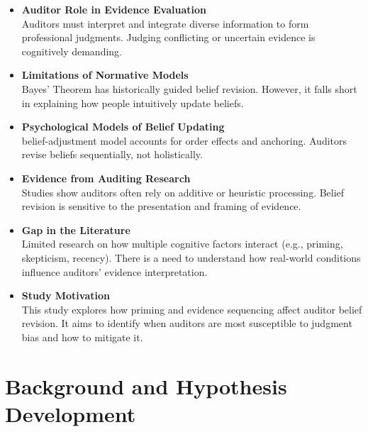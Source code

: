 \documentclass[12pt,english]{article}
\begin{document}
\begin{itemize}
    \item \textbf{Auditor Role in Evidence Evaluation} \\
    Auditors must interpret and integrate diverse information to form professional judgments. Judging conflicting or uncertain evidence is cognitively demanding.

    \item \textbf{Limitations of Normative Models} \\
    Bayes’ Theorem has historically guided belief revision. However, it falls short in explaining how people intuitively update beliefs.

    \item \textbf{Psychological Models of Belief Updating} \\
    \citet{hogarth1992} belief-adjustment model accounts for order effects and anchoring. Auditors revise beliefs sequentially, not holistically.

    \item \textbf{Evidence from Auditing Research} \\
    Studies \citep{ashton1988, messier1994} show auditors often rely on additive or heuristic processing. Belief revision is sensitive to the presentation and framing of evidence.

    \item \textbf{Gap in the Literature} \\
    Limited research on how multiple cognitive factors interact (e.g., priming, skepticism, recency). There is a need to understand how real-world conditions influence auditors’ evidence interpretation.

    \item \textbf{Study Motivation} \\
    This study explores how priming and evidence sequencing affect auditor belief revision. It aims to identify when auditors are most susceptible to judgment bias and how to mitigate it.
\end{itemize}

\section{Background and Hypothesis Development}
\end{document}
